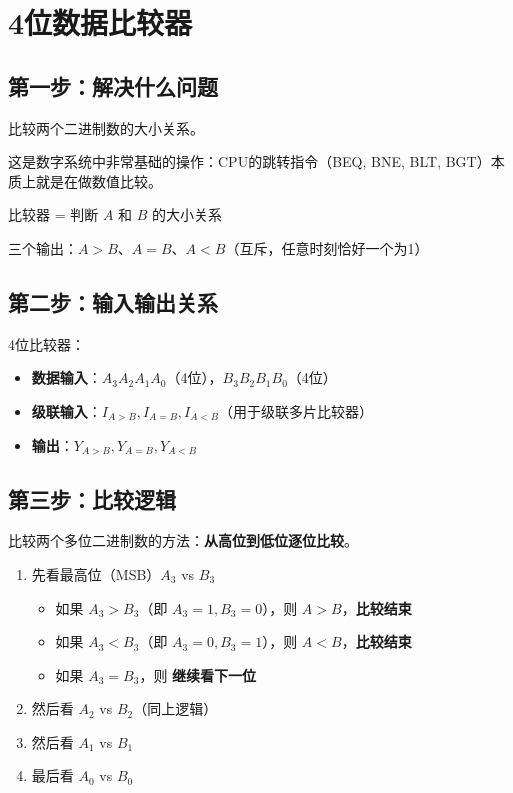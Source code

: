\chapter{4位数据比较器}

\section{第一步：解决什么问题}

比较两个二进制数的大小关系。

这是数字系统中非常基础的操作：CPU的跳转指令（BEQ, BNE, BLT, BGT）本质上就是在做数值比较。

\begin{keypoint}[比较器的本质]
比较器 = 判断 $A$ 和 $B$ 的大小关系

三个输出：$A>B$、$A=B$、$A<B$（互斥，任意时刻恰好一个为1）
\end{keypoint}

\section{第二步：输入输出关系}

4位比较器：

\begin{itemize}
  \item \textbf{数据输入}：$A_3 A_2 A_1 A_0$（4位），$B_3 B_2 B_1 B_0$（4位）
  \item \textbf{级联输入}：$I_{A>B}, I_{A=B}, I_{A<B}$（用于级联多片比较器）
  \item \textbf{输出}：$Y_{A>B}, Y_{A=B}, Y_{A<B}$
\end{itemize}

\section{第三步：比较逻辑}

比较两个多位二进制数的方法：\textbf{从高位到低位逐位比较}。

\begin{enumerate}
  \item 先看最高位（MSB）$A_3$ vs $B_3$
  \begin{itemize}
    \item 如果 $A_3 > B_3$（即 $A_3=1, B_3=0$），则 $A > B$，\textbf{比较结束}
    \item 如果 $A_3 < B_3$（即 $A_3=0, B_3=1$），则 $A < B$，\textbf{比较结束}
    \item 如果 $A_3 = B_3$，则 \textbf{继续看下一位}
  \end{itemize}
  \item 然后看 $A_2$ vs $B_2$（同上逻辑）
  \item 然后看 $A_1$ vs $B_1$
  \item 最后看 $A_0$ vs $B_0$
\end{enumerate}

